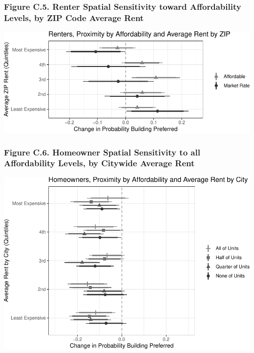 \documentclass[]{article}
\begin{document}
\hypertarget{figure-c.5.-renter-spatial-sensitivity-toward-affordability-levels-by-zip-code-average-rent}{%
\subsubsection{Figure C.5. Renter Spatial Sensitivity toward Affordability Levels, by ZIP Code Average Rent}\label{figure-c.5.-renter-spatial-sensitivity-toward-affordability-levels-by-zip-code-average-rent}}

\includegraphics{Zheng-Ruth-Renters-Paper_files/figure-latex/Figure C.5 print-1.pdf}

\hypertarget{figure-c.6.-homeowner-spatial-sensitivity-to-all-affordability-levels-by-citywide-average-rent}{%
\subsubsection{Figure C.6. Homeowner Spatial Sensitivity to all Affordability Levels, by Citywide Average Rent}\label{figure-c.6.-homeowner-spatial-sensitivity-to-all-affordability-levels-by-citywide-average-rent}}

\includegraphics{Zheng-Ruth-Renters-Paper_files/figure-latex/Figure C.6 print-1.pdf}
\end{document}
